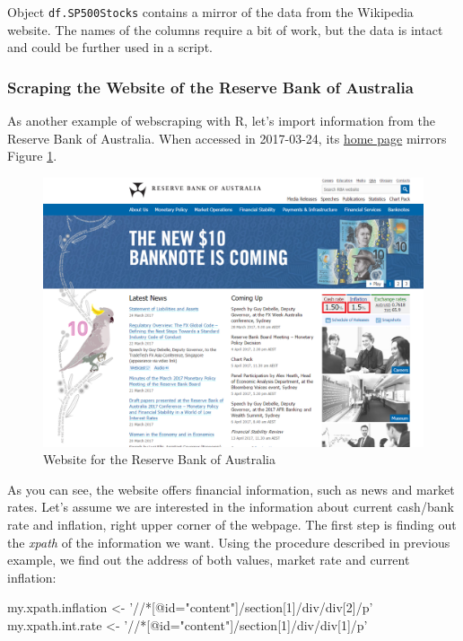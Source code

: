 \documentclass[11pt,]{book}
\newenvironment{Shaded}{\begin{snugshade}}{\end{snugshade}}
\newcommand{\StringTok}[1]{\textcolor[rgb]{0.5,0.5,0.5}{#1}}
\newcommand{\NormalTok}[1]{#1}
\begin{document}
Object \texttt{df.SP500Stocks} contains a mirror of the data from the
Wikipedia website. The names of the columns require a bit of work, but
the data is intact and could be further used in a script.

\subsubsection{Scraping the Website of the Reserve Bank of
Australia}\label{scraping-the-website-of-the-reserve-bank-of-australia}

As another example of webscraping with R, let's import information from
the Reserve Bank of Australia. When accessed in 2017-03-24, its
\href{http://www.rba.gov.au/}{home page} mirrors Figure
\ref{fig:RBA-website}.

\begin{figure}[!htbp]

{\centering \includegraphics[width=0.75\linewidth]{figs/website_RBA-webscrapping} 

}

\caption{Website for the Reserve Bank of Australia}\label{fig:RBA-website}
\end{figure}

As you can see, the website offers financial information, such as news
and market rates. Let's assume we are interested in the information
about current cash/bank rate and inflation, right upper corner of the
webpage. The first step is finding out the \emph{xpath} of the
information we want. Using the procedure described in previous example,
we find out the address of both values, market rate and current
inflation:

\begin{Shaded}
\begin{Highlighting}[]
\NormalTok{my.xpath.inflation <-}\StringTok{ '//*[@id="content"]/section[1]/div/div[2]/p'}
\NormalTok{my.xpath.int.rate <-}\StringTok{ '//*[@id="content"]/section[1]/div/div[1]/p'}
\end{Highlighting}
\end{Shaded}
\end{document}
